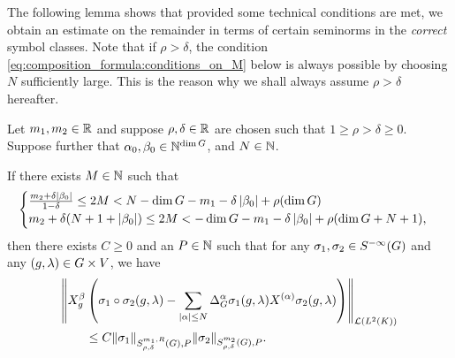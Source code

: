 The following lemma shows that provided some technical conditions are met,
we obtain an estimate on the remainder in terms of certain seminorms in the \emph{correct} symbol classes.
Note that if $\rho > \delta$,
the condition \eqref{eq:composition_formula:conditions_on_M} below is always possible by choosing $N$ sufficiently large.
This is the reason why we shall always assume $\rho > \delta$ hereafter.

\begin{lemma}
\label{lemma:prepare_composition_formula}
    Let $m_1, m_2 \in \mathbb{R}$ and suppose $\rho, \delta \in \mathbb{R}$ are chosen such that $1 \geq \rho > \delta \geq 0$.
    Suppose further that $\alpha_0, \beta_0 \in \mathbb{N}^{\dim G}$, and $N \in \mathbb{N}$.

    If there exists $M \in \mathbb{N}$ such that
    \begin{align}
        \begin{cases}
            \frac {m_2 + \delta \left|{\beta_{0}}\right|} {1 - \delta} \leq 2 M
            < N - \dim G - m_1 - \delta \left|{\beta_0}\right| + \rho (\dim G)\\
            m_2 + \delta(N + 1 + \left|{\beta_0}\right|)
            \leq 2M <
            -\dim G - m_1 - \delta \left|{\beta_0}\right| + \rho (\dim G + N + 1),
        \end{cases}
        \label{eq:composition_formula:conditions_on_M}
    \end{align}
    then there exists $C \geq 0$ and an $P \in \mathbb{N}$ such that
    for any $\sigma_1, \sigma_2 \in {S^{-\infty} (G)}$ and any $(g, \lambda) \in G \times V$,
    we have
    \begin{align*}
        &\norm [\Lin {\Lebesgue 2 \CompactGroup}] {%
            \LeftDifferentialOperator [g] \beta \left(
                \sigma_1 \circ \sigma_2(g, \lambda)
                - \sum_{\abs \alpha \leq N} \DifferenceOperatorOrder \alpha \sigma_1(g, \lambda) \TaylorLeftDifferentialOperator \alpha \sigma_2(g, \lambda)
            \right)
        }\\
        &\qquad \leq C \SymbolSemiNorm {m_1, R} {\rho, \delta} P {\sigma_1} \SymbolSemiNorm {m_2} {\rho, \delta} P {\sigma_2}.
    \end{align*}
\end{lemma}
